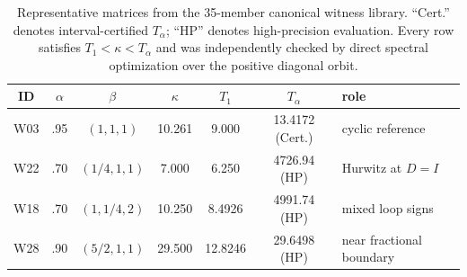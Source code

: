 \begin{table}[t]
\centering
\small
\caption{Representative matrices from the 35-member canonical witness library. ``Cert.'' denotes interval-certified $T_\alpha$; ``HP'' denotes high-precision evaluation. Every row satisfies $T_1<\kappa<T_\alpha$ and was independently checked by direct spectral optimization over the positive diagonal orbit.}
\label{tab:canonical-witnesses}
\begin{tabular}{c c c c c c l}
\toprule
ID & $\alpha$ & $\beta$ & $\kappa$ & $T_1$ & $T_\alpha$ & role\\
\midrule
W03 & .95 & $(1,1,1)$ & 10.261 & 9.000 & 13.4172 (Cert.) & cyclic reference\\
W22 & .70 & $(1/4,1,1)$ & 7.000 & 6.250 & 4726.94 (HP) & Hurwitz at $D=I$\\
W18 & .70 & $(1,1/4,2)$ & 10.250 & 8.4926 & 4991.74 (HP) & mixed loop signs\\
W28 & .90 & $(5/2,1,1)$ & 29.500 & 12.8246 & 29.6498 (HP) & near fractional boundary\\
\bottomrule
\end{tabular}
\end{table}
